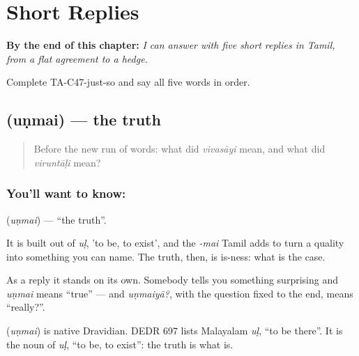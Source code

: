 
\chapter{Short Replies}
\label{ch:ta-replies}

\begin{chapteropening}
\textbf{By the end of this chapter:} \emph{I can answer with five short replies in Tamil, from a flat agreement to a hedge.}

Complete TA-C47-just-so and say all five words in order.
\end{chapteropening}

\section[\texorpdfstring{\ta{உண்மை} (uṇmai)}{உண்மை (uṇmai)}]{ (uṇmai) — the truth}

\label{lesson:TA-C47-true}



\begin{quote}
Before the new run of words: what did \emph{vivasāyi} mean, and what did \emph{viruntāḷi} mean?
\end{quote}

\subsection*{You'll want to know: }
\textbf{} (\emph{uṇmai}) — \textquotedblleft{}the truth\textquotedblright{}.

It is built out of \emph{uḷ}, 'to be, to exist', and the \emph{-mai} Tamil adds to turn a quality into something you can name. The truth, then, is is-ness: what is the case.

As a reply it stands on its own. Somebody tells you something surprising and \emph{uṇmai} means \textquotedblleft{}true\textquotedblright{} — and \emph{uṇmaiyā?}, with the question fixed to the end, means \textquotedblleft{}really?\textquotedblright{}.

\begin{cousinweb}
\textbf{} (\emph{uṇmai}) is native Dravidian. DEDR 697 lists Malayalam \emph{uḷ}, \textquotedblleft{}to be there\textquotedblright{}. It is the noun of \emph{uḷ}, \textquotedblleft{}to be, to exist\textquotedblright{}: the truth is what is.
\end{cousinweb}

